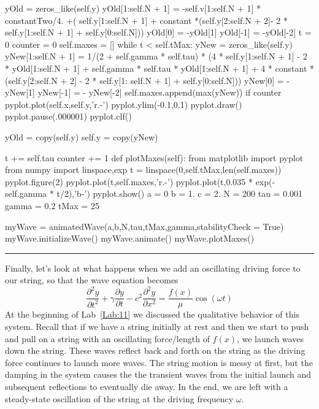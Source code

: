 \begin{enumerate}
\begin{codeexample}
\begin{VerbatimOut}{\listingFile}
        yOld = zeros_like(self.y)
        yOld[1:self.N + 1] = -self.v[1:self.N + 1] * constantTwo/4. +( self.y[1:self.N + 1] + constant *(self.y[2:self.N + 2]- 2 * self.y[1:self.N + 1] + self.y[0:self.N])) 
        yOld[0] = -yOld[1]
        yOld[-1] = -yOld[-2]
        t = 0
        counter = 0
        self.maxes = []
        while t < self.tMax:
            yNew = zeros_like(self.y)
            yNew[1:self.N + 1] = 1/(2 + self.gamma * self.tau) * (4 * self.y[1:self.N + 1] - 2 * yOld[1:self.N + 1] + self.gamma * self.tau * yOld[1:self.N + 1] + 4 * constant * (self.y[2:self.N + 2] - 2 * self.y[1: self.N + 1] + self.y[0:self.N]))
            yNew[0] =  -yNew[1]
            yNew[-1] = - yNew[-2]
            self.maxes.append(max(yNew))
            if counter %
                pyplot.plot(self.x,self.y,'r.-')
                pyplot.ylim(-0.1,0.1)
                pyplot.draw()
                pyplot.pause(.000001)
                pyplot.clf()


            yOld = copy(self.y)
            self.y = copy(yNew)


            t += self.tau
            counter += 1
    def plotMaxes(self):
        from matplotlib import pyplot
        from numpy import linspace,exp
        t = linspace(0,self.tMax,len(self.maxes))
        pyplot.figure(2)
        pyplot.plot(t,self.maxes,'r.-')
        pyplot.plot(t,0.035 * exp(-self.gamma * t/2),'b-')
        pyplot.show()
a = 0
b = 1.
c = 2.
N = 200
tau = 0.001
gamma = 0.2
tMax = 25


myWave = animatedWave(a,b,N,tau,tMax,gamma,stabilityCheck = True)
myWave.initializeWave()
myWave.animate()
myWave.plotMaxes()
\end{VerbatimOut}
\end{codeexample}
\else
\noindent\rule{5 in}{0.01 in}
\fi

\end{enumerate}


Finally, let's look at what happens when we add an oscillating
driving force to our string, so that the wave equation becomes
\begin{equation}\label{eq:WaveDampedDriven}
    \frac{\partial^2 y}{\partial t^2} + \gamma \frac{\partial
    y}{\partial t} - c^2 \frac{\partial^2 y}{\partial x^2} =
    \frac{f(x)}{\mu} \cos(\omega t)
\end{equation}
At the beginning of Lab~\ref{Lab:11} we discussed the
qualitative behavior of this system.  Recall that if we have a
string initially at rest and then we start to push and pull on
a string with an oscillating force/length of $f(x)$, we launch
waves down the string.  These waves reflect back and forth on
the string as the driving force continues to launch more waves.
The string motion is messy at first, but the damping in the
system causes the the transient waves from the initial launch
and subsequent reflections to eventually die away.  In the end,
we are left with a steady-state oscillation of the string at
the driving frequency $\omega$.

